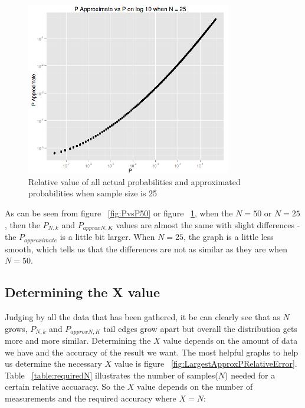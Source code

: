 \documentclass[12pt]{article}
\begin{document}
\begin{figure}
	\centering
  \includegraphics[width=0.8\textwidth]{PvsP25}
	\caption{Relative value of all actual probabilities and approximated probabilities when sample size is 25}
	\label{fig:PvsP25}
\end{figure}

As can be seen from figure ~\ref{fig:PvsP50} or figure ~\ref{fig:PvsP25}, when the $N = 50$ or $N = 25$, then the $P_{N, k}$ and $P_{approx N, K}$ values are almost the same with slight differences - the $P_{approximate}$ is a little bit larger. When $N = 25$, the graph is a little less smooth, which tells us that the differences are not as similar as they are when $N = 50$.

\subsection{Determining the X value}
Judging by all the data that has been gathered, it be can clearly see that as $N$ grows, $P_{N, k}$ and $P_{approx N, K}$ tail edges grow apart but overall the distribution gets more and more similar. Determining the $X$ value depends on the amount of data we have and the accuracy of the result we want. The most helpful graphs to help us determine the necessary $X$ value is figure ~\ref{fig:LargestApproxPRelativeError}. Table ~\ref{table:requiredN} illustrates the number of samples($N$) needed for a certain relative accuaracy. So the $X$ value depends on the number of measurements and the required accuracy where $X = N$:
\end{document}

